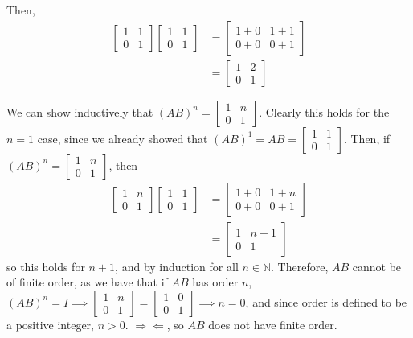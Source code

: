 \documentclass[12pt,letterpaper]{article}
\theoremstyle{definition}
\newcommand{\contra}{\Rightarrow\!\Leftarrow}
\newcommand{\N}{\mathbb{N}}
\begin{document}
Then,
\begin{align*}
  \begin{bmatrix}
    1 & 1 \\
    0 & 1
  \end{bmatrix}
  \begin{bmatrix}
    1 & 1 \\
    0 & 1
  \end{bmatrix} &=
  \begin{bmatrix}
    1 + 0 & 1 + 1 \\
    0 + 0 & 0 + 1
  \end{bmatrix} \\
  &=
  \begin{bmatrix}
    1 & 2 \\
    0 & 1
  \end{bmatrix}
\end{align*}

We can show inductively that \((AB)^{n} = \begin{bmatrix} 1 & n \\  0 & 1 \end{bmatrix}\). Clearly this holds for the $n = 1$ case, since we already showed that \((AB)^{1} = AB = \begin{bmatrix} 1 & 1 \\  0 & 1 \end{bmatrix}\). Then, if \((AB)^{n} = \begin{bmatrix} 1 & n \\  0 & 1 \end{bmatrix}\), then
\begin{align*}
  \begin{bmatrix}
    1 & n \\
    0 & 1
  \end{bmatrix}
  \begin{bmatrix}
    1 & 1 \\
    0 & 1
  \end{bmatrix} &=
  \begin{bmatrix}
    1 + 0 & 1 + n \\
    0 + 0 & 0 + 1
  \end{bmatrix} \\
  &=
  \begin{bmatrix}
    1 & n+1 \\
    0 & 1
  \end{bmatrix}
\end{align*}
so this holds for \(n+1\), and by induction for all \(n \in \N\). Therefore, \(AB\) cannot be of finite order, as we have that if \(AB\) has order \(n\), \((AB)^{n} = I \implies \begin{bmatrix} 1 & n \\  0 & 1 \end{bmatrix} = \begin{bmatrix} 1 & 0 \\  0 & 1 \end{bmatrix} \implies n = 0\), and since order is defined to be a positive integer, \(n > 0\). \(\contra\), so \(AB\) does not have finite order.
\end{document}
